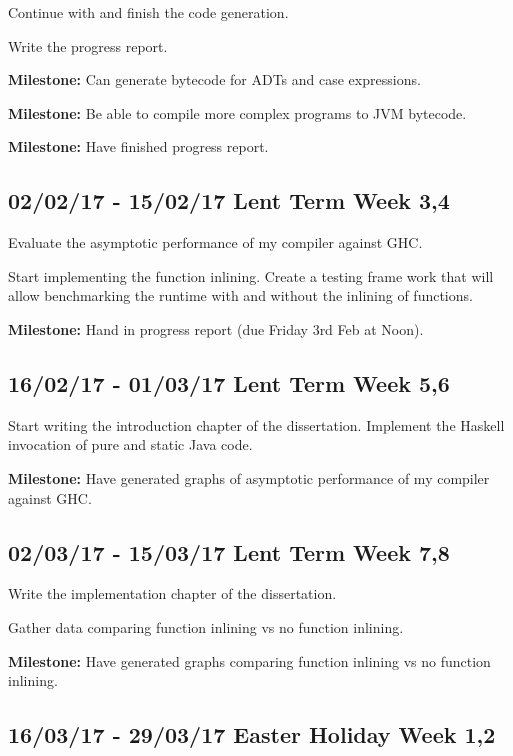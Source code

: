 \documentclass[12pt,a4paper,twoside]{article}
\begin{document}
    Continue with and finish the code generation.

    Write the progress report.

    \textbf{Milestone:} Can generate bytecode for ADTs and case expressions.

    \textbf{Milestone:} Be able to compile more complex programs to JVM bytecode.

    \textbf{Milestone:} Have finished progress report.

    \subsection*{02/02/17 - 15/02/17 \hfill Lent Term Week 3,4}

      Evaluate the asymptotic performance of my compiler against GHC.

      Start implementing the function inlining. Create a testing frame work that will allow benchmarking the runtime with and without the
      inlining of functions.


      \textbf{Milestone:} Hand in progress report (due Friday 3rd Feb at Noon).

    \subsection*{16/02/17 - 01/03/17 \hfill Lent Term Week 5,6}

      Start writing the introduction chapter of the dissertation. Implement the Haskell invocation of pure and static Java code.

      \textbf{Milestone:} Have generated graphs of asymptotic performance of my compiler against GHC.

    \subsection*{02/03/17 - 15/03/17 \hfill Lent Term Week 7,8}

      Write the implementation chapter of the dissertation.

      Gather data comparing function inlining vs no function inlining.

     \textbf{Milestone:} Have generated graphs comparing function inlining vs no function inlining.

    \subsection*{16/03/17 - 29/03/17 \hfill Easter Holiday Week 1,2}
\end{document}
